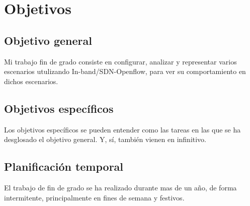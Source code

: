\documentclass[a4paper, 12pt]{book}
\begin{document}
	
	
	
	
	
	\cleardoublepage %
	\chapter{Objetivos} %
	\label{chap:objetivos} %
	
	\section{Objetivo general} %
	\label{sec:objetivo-general} %
	
	Mi trabajo fin de grado consiste en configurar, analizar y representar varios escenarios utulizando In-band/SDN-Openflow, para ver su comportamiento en dichos escenarios.
	
	\section{Objetivos específicos}
	\label{sec:objetivos-especificos}
	
	Los objetivos específicos se pueden entender como las tareas en las que se ha desglosado el objetivo general.
	Y, sí, también vienen en infinitivo.
	
	
	\section{Planificación temporal}
	\label{sec:planificacion-temporal}
	
	El trabajo de fin de grado se ha realizado durante mas de un año, de forma intermitente, principalmente en fines de semana y festivos. 
	
	
	
	\cleardoublepage
\end{document}
